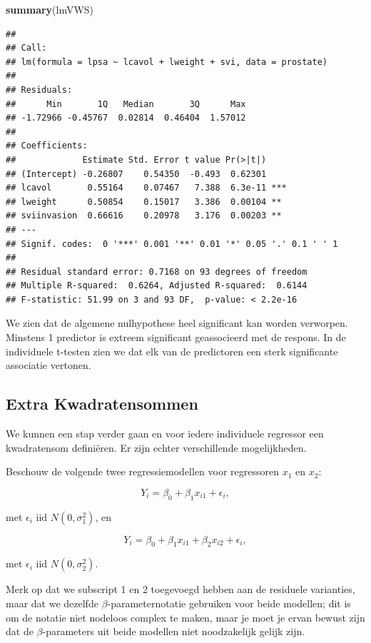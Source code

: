\documentclass[
  12pt,dutch]{book}
\newenvironment{Shaded}{\begin{snugshade}}{\end{snugshade}}
\newcommand{\FunctionTok}[1]{\textcolor[rgb]{0.13,0.29,0.53}{\textbf{#1}}}
\newcommand{\NormalTok}[1]{#1}
\theoremstyle{definition}
\theoremstyle{definition}
\theoremstyle{definition}
\theoremstyle{definition}
\theoremstyle{remark}
\begin{document}
\begin{Shaded}
\begin{Highlighting}[]
\FunctionTok{summary}\NormalTok{(lmVWS)}
\end{Highlighting}
\end{Shaded}

\begin{verbatim}
## 
## Call:
## lm(formula = lpsa ~ lcavol + lweight + svi, data = prostate)
## 
## Residuals:
##      Min       1Q   Median       3Q      Max 
## -1.72966 -0.45767  0.02814  0.46404  1.57012 
## 
## Coefficients:
##             Estimate Std. Error t value Pr(>|t|)    
## (Intercept) -0.26807    0.54350  -0.493  0.62301    
## lcavol       0.55164    0.07467   7.388  6.3e-11 ***
## lweight      0.50854    0.15017   3.386  0.00104 ** 
## sviinvasion  0.66616    0.20978   3.176  0.00203 ** 
## ---
## Signif. codes:  0 '***' 0.001 '**' 0.01 '*' 0.05 '.' 0.1 ' ' 1
## 
## Residual standard error: 0.7168 on 93 degrees of freedom
## Multiple R-squared:  0.6264, Adjusted R-squared:  0.6144 
## F-statistic: 51.99 on 3 and 93 DF,  p-value: < 2.2e-16
\end{verbatim}

We zien dat de algemene nulhypothese heel significant kan worden verworpen. Minstens 1 predictor is extreem significant geassocieerd met de respons. In de individuele t-testen zien we dat elk van de predictoren een sterk significante associatie vertonen.

\subsection{Extra Kwadratensommen}\label{extra-kwadratensommen}

We kunnen een stap verder gaan en voor iedere individuele regressor een kwadratensom definiëren. Er zijn echter verschillende mogelijkheden.

Beschouw de volgende twee regressiemodellen voor regressoren \(x_1\) en \(x_2\):

\[
  Y_i = \beta_0+\beta_1 x_{i1} + \epsilon_i,
\]

met \(\epsilon_i\text{ iid } N(0,\sigma_1^{2})\), en

\[
Y_i = \beta_0+\beta_1 x_{i1}+\beta_2 x_{i2} + \epsilon_i,
\]

met \(\epsilon_i\text{ iid } N(0,\sigma_2^{2})\).

Merk op dat we subscript 1 en 2 toegevoegd hebben aan de residuele varianties, maar dat we dezelfde \(\beta\)-parameternotatie gebruiken voor beide modellen; dit is om de notatie niet nodeloos complex te maken, maar je moet je ervan bewust zijn dat de \(\beta\)-parameters uit beide modellen niet noodzakelijk gelijk zijn.
\end{document}
